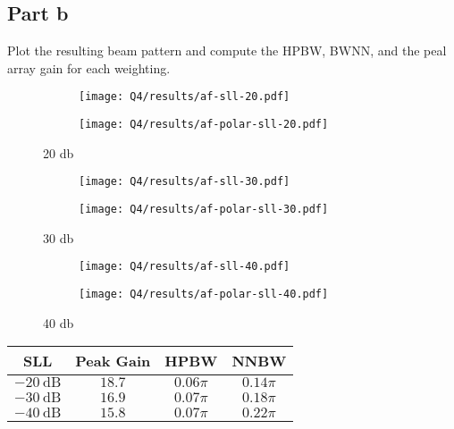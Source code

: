 \documentclass[12pt,onecolumn,a4paper]{article}
\begin{document}
\subsection{Part b}
{\color{questioncolor}
Plot the resulting beam pattern and compute the HPBW, BWNN, and the peal array gain for each weighting.\\
}


\begin{figure}[H]
	\begin{subfigure}{.75\linewidth}
		\texttt{[image: Q4/results/af-sll-20.pdf]}
		\caption{}
	\end{subfigure}
	\hfill
	\begin{subfigure}{.2\linewidth}
		\texttt{[image: Q4/results/af-polar-sll-20.pdf]}
		\caption{}
	\end{subfigure}
	\caption{20 db}
\end{figure}


\begin{figure}[H]
	\begin{subfigure}{.75\linewidth}
		\texttt{[image: Q4/results/af-sll-30.pdf]}
		\caption{}
	\end{subfigure}
	\hfill
	\begin{subfigure}{.2\linewidth}
		\texttt{[image: Q4/results/af-polar-sll-30.pdf]}
		\caption{}
	\end{subfigure}
	\caption{30 db}
\end{figure}



\begin{figure}[H]
	\begin{subfigure}{.75\linewidth}
		\texttt{[image: Q4/results/af-sll-40.pdf]}
		\caption{}
	\end{subfigure}
	\hfill
	\begin{subfigure}{.2\linewidth}
		\texttt{[image: Q4/results/af-polar-sll-40.pdf]}
		\caption{}
	\end{subfigure}
	\caption{40 db}
\end{figure}


\begin{table}[H]
	\centering
	\begin{tabular}{cccc}
		\toprule
		\textbf{SLL} & \textbf{Peak Gain} & \textbf{HPBW} & \textbf{NNBW} \\\midrule
		$-20\ \text{dB}$ & $18.7$ & $0.06\pi$ & $0.14\pi$ \\\midrule
		$-30\ \text{dB}$ & $16.9$ & $0.07\pi$ & $0.18\pi$ \\\midrule
		$-40\ \text{dB}$ & $15.8$ & $0.07\pi$ & $0.22\pi$ \\
		\bottomrule
	\end{tabular}
\end{table}
\end{document}
